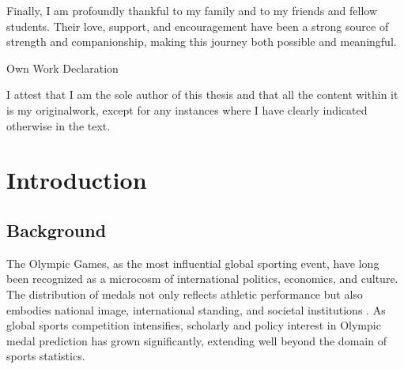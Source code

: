 \documentclass[11pt,twoside]{article}
\numberwithin{Theorem}{section}
\numberwithin{Definition}{section}
\numberwithin{Lemma}{section}
\numberwithin{Algorithm}{section}
\numberwithin{equation}{section}
\begin{document}
Finally, I am profoundly thankful to my family and to my friends and fellow students. Their love, support, and encouragement have been a strong source of strength and companionship, making this journey both possible and meaningful.

\clearpage

\begin{center}
\Large{Own Work Declaration}
\end{center}

I attest that I am the sole author of this thesis and that all the content within it is my originalwork, except for any instances where I have clearly indicated otherwise in the text.

\cleardoublepage

\pagestyle{plain}
\setcounter{page}{1}

\tableofcontents
\clearpage
\listoftables
\listoffigures
\cleardoublepage

\setcounter{page}{1}

\section{Introduction}
\label{sec.intro}

\subsection{Background}
\label{subsec:background}

The Olympic Games, as the most influential global sporting event, have long been recognized as a microcosm of international politics, economics, and culture. The distribution of medals not only reflects athletic performance but also embodies national image, international standing, and societal institutions \cite{kaplanidou2010}. As global sports competition intensifies, scholarly and policy interest in Olympic medal prediction has grown significantly, extending well beyond the domain of sports statistics. 
\end{document}
